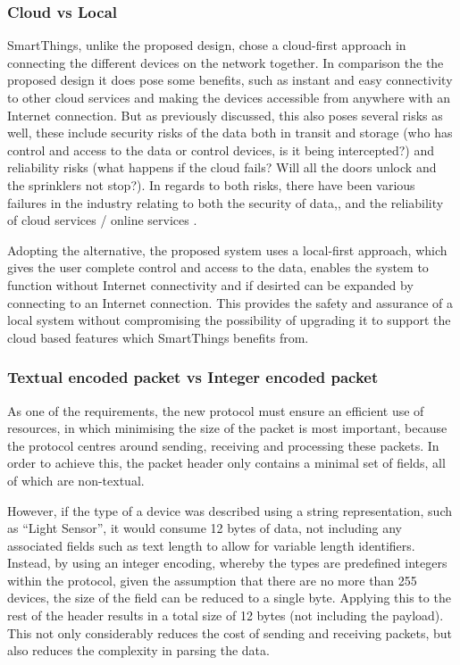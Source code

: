 \subsubsection{Cloud vs Local} %
\label{ssub:cloud_vs_local}
SmartThings, unlike the proposed design, chose a cloud-first approach in connecting the different devices on the network together. In comparison the the proposed design it does pose some benefits, such as instant and easy connectivity to other cloud services and making the devices accessible from anywhere with an Internet connection. But as previously discussed, this also poses several risks as well, these include security risks of the data both in transit and storage (who has control and access to the data or control devices, is it being intercepted?) and reliability risks (what happens if the cloud fails? Will all the doors unlock and the sprinklers not stop?). In regards to both risks, there have been various failures in the industry relating to both the security of data,\cite{Playstation}, and the reliability of cloud services / online services \cite{Amazon, Google}. 

Adopting the alternative, the proposed system uses a local-first approach, which gives the user complete control and access to the data, enables the system to function without Internet connectivity and if desirted can be expanded by connecting to an Internet connection. This provides the safety and assurance of a local system without compromising the possibility of upgrading it to support the cloud based features which SmartThings benefits from.


\subsubsection{Textual encoded packet vs Integer encoded packet} %
\label{ssub:textual_packet_vs_encoded_packet}
As one of the requirements, the new protocol must ensure an efficient use of resources, in which minimising the size of the packet is most important, because the protocol centres around sending, receiving and processing these packets. In order to achieve this, the packet header only contains a minimal set of fields, all of which are non-textual.

However, if the type of a device was described using a string representation, such as ``Light Sensor'', it would consume 12 bytes of data, not including any associated fields such as text length to allow for variable length identifiers. Instead, by using an integer encoding, whereby the types are predefined integers within the protocol, given the assumption that there are no more than 255 devices, the size of the field can be reduced to a single byte. Applying this to the rest of the header results in a total size of 12 bytes (not including the payload). This not only considerably reduces the cost of sending and receiving packets, but also reduces the complexity in parsing the data.

